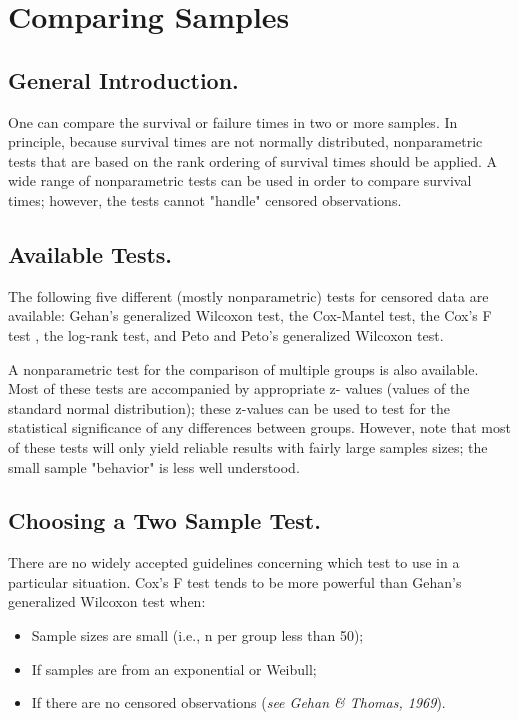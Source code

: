\documentclass[11pt]{article} %
\begin{document}
\newpage
\section{Comparing Samples}


\subsection{General Introduction. }One can compare the survival or failure times in two or more samples. In principle, because survival times are not normally distributed, nonparametric tests that are based on the rank ordering of survival times should be applied. A wide range of nonparametric tests can be used in order to compare survival times; however, the tests cannot "handle" censored observations.

\subsection{Available Tests.} The following five different (mostly nonparametric) tests for censored data are available: Gehan's generalized Wilcoxon test, the Cox-Mantel test, the Cox's F test , the log-rank test, and Peto and Peto's generalized Wilcoxon test. 

A nonparametric test for the comparison of multiple groups is also available. Most of these tests are accompanied by appropriate z- values (values of the standard normal distribution); these z-values can be used to test for the statistical significance of any differences between groups. However, note that most of these tests will only yield reliable results with fairly large samples sizes; the small sample "behavior" is less well understood.

\subsection{Choosing a Two Sample Test.} There are no widely accepted guidelines concerning which test to use in a particular situation. Cox's F test tends to be more powerful than Gehan's generalized Wilcoxon test when:

\begin{itemize}
\item Sample sizes are small (i.e., n per group less than 50);
\item If samples are from an exponential or Weibull;
\item If there are no censored observations (\textit{see Gehan \& Thomas, 1969}).
\end{itemize}
\end{document}
